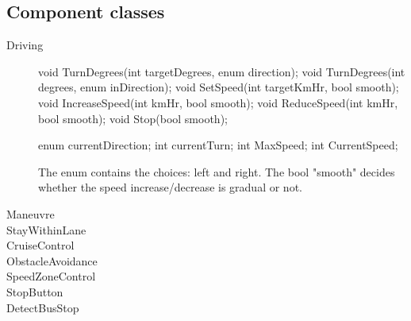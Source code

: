 \subsection{Component classes}
\begin{description}
    \item [Driving]
    void TurnDegrees(int targetDegrees, enum direction);
    void TurnDegrees(int degrees, enum inDirection);
    void SetSpeed(int targetKmHr, bool smooth);
    void IncreaseSpeed(int kmHr, bool smooth);
    void ReduceSpeed(int kmHr, bool smooth);
    void Stop(bool smooth);
    
    enum currentDirection;
    int currentTurn;
    int MaxSpeed;
    int CurrentSpeed;

    The enum contains the choices: left and right. The bool "smooth" decides whether the speed increase/decrease is gradual or not. 
    
    \item [Maneuvre]
    \item [StayWithinLane]
    \item [CruiseControl]
    \item [ObstacleAvoidance]
    \item [SpeedZoneControl]
    \item [StopButton]
    \item [DetectBusStop]
\end{description}